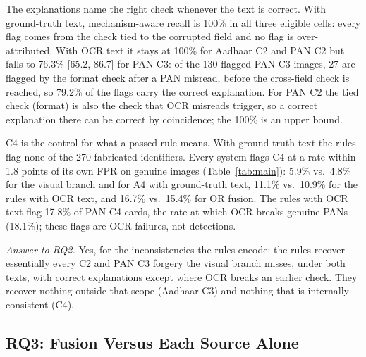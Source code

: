 \documentclass[12pt]{article}
\begin{document}
The explanations name the right check whenever the text is correct.
With ground-truth text, mechanism-aware recall is 100\% in all three
eligible cells: every flag comes from the check tied to the corrupted
field and no flag is over-attributed. With OCR text it stays at 100\%
for Aadhaar C2 and PAN C2 but falls to 76.3\% [65.2, 86.7] for PAN C3:
of the 130 flagged PAN C3 images, 27 are flagged by the format check
after a PAN misread, before the cross-field check is reached, so 79.2\%
of the flags carry the correct explanation. For PAN C2 the tied check
(format) is also the check that OCR misreads trigger, so a correct
explanation there can be correct by coincidence; the 100\% is an upper
bound.

C4 is the control for what a passed rule means. With ground-truth text
the rules flag none of the 270 fabricated identifiers. Every system
flags C4 at a rate within 1.8 points of its own FPR on genuine images
(Table~\ref{tab:main}): 5.9\% vs.\ 4.8\% for the visual branch and for A4
with ground-truth text, 11.1\% vs.\ 10.9\% for the rules with OCR text,
and 16.7\% vs.\ 15.4\% for OR fusion. The rules with OCR text flag 17.8\% of PAN C4
cards, the rate at which OCR breaks genuine PANs (18.1\%); these flags
are OCR failures, not detections.

\emph{Answer to RQ2.} Yes, for the inconsistencies the rules encode: the
rules recover essentially every C2 and PAN C3 forgery the visual branch
misses, under both texts, with correct explanations except where OCR
breaks an earlier check. They recover nothing outside that scope
(Aadhaar C3) and nothing that is internally consistent (C4).

\subsection{RQ3: Fusion Versus Each Source Alone}
\label{subsec:res-rq3}
\end{document}
